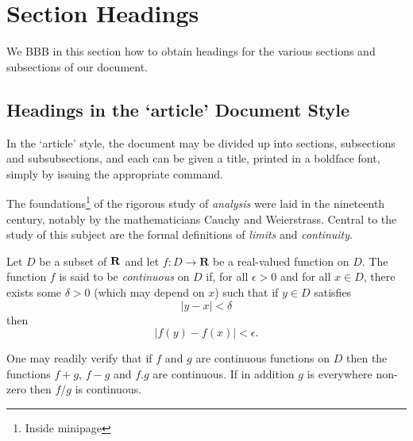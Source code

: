 \documentclass[a4paper,12pt]{msty}
\begin{document}
\begin{titlepage}
  \maketitle
  \thispagestyle{empty}

\end{titlepage}

\pagestyle{plain} %
\tableofcontents
\newpage
\listoffigures
\listoftables

\newpage
\pagestyle{fancy} %

\section{Section Headings}
We \citep{Ancey1996} BBB \citep{RR73} in this section how to obtain headings
for the various sections and subsections of our
document.
\subsection{Headings in the ‘article’ Document Style}
In the ‘article’ style, the document may be divided up
into sections, subsections and subsubsections, and each
can be given a title, printed in a boldface font,
simply by issuing the appropriate command.

The foundations\footnote{Inside minipage} of the rigorous study of \textit{analysis}
were laid in the nineteenth century, notably by the
mathematicians Cauchy and Weierstrass. Central to the
study of this subject are the formal definitions of
\textit{limits} and \textit{continuity}.

Let $D$ be a subset of $\bf R$ and let
$f \colon D \to \textbf{R}$ be a real-valued function on
$D$. The function $f$ is said to be \textit{continuous} on
$D$ if, for all $\epsilon > 0$ and for all $x \in D$,
there exists some $\delta > 0$ (which may depend on $x$)
such that if $y \in D$ satisfies
\[ |y - x| < \delta \]
then
\[ |f(y) - f(x)| < \epsilon. \]

One may readily verify that if $f$ and $g$ are continuous
functions on $D$ then the functions $f+g$, $f-g$ and
$f.g$ are continuous. If in addition $g$ is everywhere
non-zero then $f/g$ is continuous.
\end{document}
